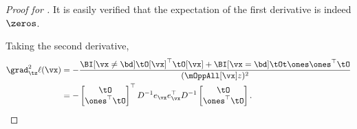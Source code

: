 \begin{proof}[Proof for ]
It is easily verified that the expectation of the first derivative is indeed $\zeros$.
\begin{comment}
Note that the expectation of the first derivative is indeed $\zeros$,
\begin{align*}
  \E[\grad_{\tz} \ell(\vx)]
  &= 
  \begin{bmatrix}
    \tO \\
    -\ones^\top \tO
  \end{bmatrix}^\top
  D^{-1} \E[e_\vx] \\
  &= 
  \begin{bmatrix}
    \tO \\
    -\ones^\top \tO
  \end{bmatrix}^\top
  D^{-1} \mu \\
  &= 
  \begin{bmatrix}
    \tO \\
    -\ones^\top \tO
  \end{bmatrix}^\top
  \ones \\
  &= \ones^\top\tO -\ones^\top \tO \\
  &= \zeros^\top.
\end{align*}
\end{comment}

Taking the second derivative,
\begin{align}
  \grad^2_{\tz} \ell(\vx)
  &= -\frac{\BI[\vx \neq \bd] \tO[\vx]^\top \tO[\vx] + \BI[\vx = \bd] \tOt \ones \ones^\top \tO}{(\mOppAll[\vx] z)^2} \nonumber \\
  &= - 
  \begin{bmatrix}
    \tO \\
    \ones^\top \tO
  \end{bmatrix}^\top
    D^{-1} e_\vx e_\vx^\top D^{-1} 
  \begin{bmatrix}
    \tO \\
    \ones^\top \tO
  \end{bmatrix}. \label{eqn:lhood-hess}%
\end{align}


\end{proof}
